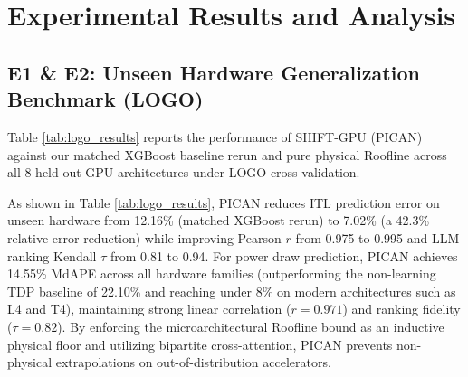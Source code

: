 \documentclass[preprint,12pt]{elsarticle}
\begin{document}
\section{Experimental Results and Analysis}
\label{sec:results}

\subsection{E1 \& E2: Unseen Hardware Generalization Benchmark (LOGO)}
Table \ref{tab:logo_results} reports the performance of SHIFT-GPU (PICAN) against our matched XGBoost baseline rerun \citep{fadel2026wattgpu} and pure physical Roofline across all 8 held-out GPU architectures under LOGO cross-validation.

\begin{table}[h]
\centering
\caption{Zero-shot performance comparison on unseen hardware architectures under the Leave-One-GPU-Out (LOGO) protocol. Baseline results report our matched XGBoost rerun \citep{fadel2026wattgpu} fitted on identical training folds. Lower MdAPE indicates superior prediction accuracy; higher $\tau$ indicates superior hardware ranking.}
\label{tab:logo_results}
\end{table}

As shown in Table \ref{tab:logo_results}, PICAN reduces ITL prediction error on unseen hardware from 12.16\% (matched XGBoost rerun) to 7.02\% (a 42.3\% relative error reduction) while improving Pearson $r$ from 0.975 to 0.995 and LLM ranking Kendall $\tau$ from 0.81 to 0.94. For power draw prediction, PICAN achieves 14.55\% MdAPE across all hardware families (outperforming the non-learning TDP baseline of 22.10\% and reaching under 8\% on modern architectures such as L4 and T4), maintaining strong linear correlation ($r = 0.971$) and ranking fidelity ($\tau = 0.82$). By enforcing the microarchitectural Roofline bound as an inductive physical floor and utilizing bipartite cross-attention, PICAN prevents non-physical extrapolations on out-of-distribution accelerators. 
\end{document}
